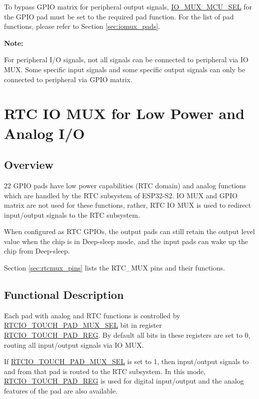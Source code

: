 \documentclass[main\_\_EN.tex]{subfiles}
\begin{document}
To bypass GPIO matrix for peripheral output signals, \hyperref[fielddesc:IOMUXMCUSEL]{IO\_MUX\_MCU\_SEL} for the GPIO pad must be set to the required pad function. For the list of pad functions, please refer to Section \ref{sec:iomux_pads}.


{\bfseries Note:}

For peripheral I/O signals, not all signals can be connected to peripheral via IO MUX. Some specific input signals and some specific output signals can only be connected to peripheral via GPIO matrix.


\section{RTC IO MUX for Low Power and Analog I/O}

\subsection{Overview}

22 GPIO pads have low power capabilities (RTC domain) and analog functions which are handled by the RTC subsystem of ESP32-S2. IO MUX and GPIO matrix are not used for these functions, rather, RTC IO MUX is used to redirect input/output signals to the RTC subsystem.

When configured as RTC GPIOs, the output pads can still retain the output level value when the chip is in Deep-sleep mode, and the input pads can wake up the chip from Deep-sleep.

Section \ref{sec:rtcmux_pins} lists the RTC\_MUX pins and their functions.

\subsection{Functional Description}

Each pad with analog and RTC functions is controlled by \hyperref[fielddesc:RTCIOTOUCHPADNMUXSEL]{RTCIO\_TOUCH\_PAD\_MUX\_SEL} bit in register \hyperref[regdesc:RTCIOTOUCHPADNREG]{RTCIO\_TOUCH\_PAD\_REG}. By default all bits in these registers are set to 0, routing all input/output signals via IO MUX.

If \hyperref[fielddesc:RTCIOTOUCHPADNMUXSEL]{RTCIO\_TOUCH\_PAD\_MUX\_SEL} is set to 1, then input/output signals to and from that pad is routed to the RTC subsystem. In this mode, \hyperref[regdesc:RTCIOTOUCHPADNREG]{RTCIO\_TOUCH\_PAD\_REG} is used for digital input/output and the analog features of the pad are also available.
\end{document}
